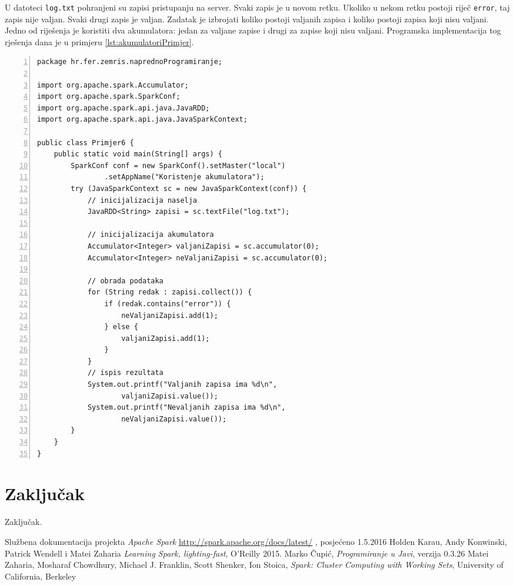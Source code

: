 \documentclass[times, utf8, zavrsni, numeric]{fer}
\begin{document}
U datoteci \texttt{log.txt} pohranjeni su zapisi pristupanju na server. Svaki zapis je u novom retku. Ukoliko u nekom retku postoji riječ \texttt{error}, taj zapis nije valjan. Svaki drugi zapis je valjan. Zadatak je izbrojati koliko postoji valjanih zapisa i koliko postoji zapisa koji nisu valjani. Jedno od riješenja je koristiti dva akumulatora: jedan za valjane zapise i drugi za zapise koji nisu valjani. Programska implementacija tog rješenja dana je u primjeru \ref{lst:akumulatoriPrimjer}.

\begin{lstlisting}[numbers=left, label={lst:akumulatoriPrimjer}, caption={Korištenje akumulatora.}, escapechar=|]
package hr.fer.zemris.naprednoProgramiranje;

import org.apache.spark.Accumulator;
import org.apache.spark.SparkConf;
import org.apache.spark.api.java.JavaRDD;
import org.apache.spark.api.java.JavaSparkContext;

public class Primjer6 {
	public static void main(String[] args) {
		SparkConf conf = new SparkConf().setMaster("local")
				.setAppName("Koristenje akumulatora");
		try (JavaSparkContext sc = new JavaSparkContext(conf)) {
			// inicijalizacija naselja
			JavaRDD<String> zapisi = sc.textFile("log.txt");

			// inicijalizacija akumulatora
			Accumulator<Integer> valjaniZapisi = sc.accumulator(0);
			Accumulator<Integer> neValjaniZapisi = sc.accumulator(0);

			// obrada podataka
			for (String redak : zapisi.collect()) {
				if (redak.contains("error")) {
					neValjaniZapisi.add(1);
				} else {
					valjaniZapisi.add(1);
				}
			}
			// ispis rezultata
			System.out.printf("Valjanih zapisa ima %d\n",
					valjaniZapisi.value());
			System.out.printf("Nevaljanih zapisa ima %d\n",
					neValjaniZapisi.value());
		}
	}
}

\end{lstlisting}

\chapter{Zaključak} 
Zaključak.


\begin{thebibliography}{9}
  Službena dokumentacija projekta \emph{Apache Spark} \url{http://spark.apache.org/docs/latest/} , posjećeno 1.5.2016
  Holden Karau, Andy Konwinski, Patrick Wendell i Matei Zaharia
  \emph{Learning Spark, lighting-fast}, O'Reilly 2015.
  Marko Čupić,
  \emph{Programiranje u Javi},
  verzija 0.3.26
  Matei Zaharia, Mosharaf Chowdhury, Michael J. Franklin, Scott Shenker, Ion Stoica,
  \emph{Spark: Cluster Computing with Working Sets}, University of California, Berkeley
\end{thebibliography}
\end{document}
